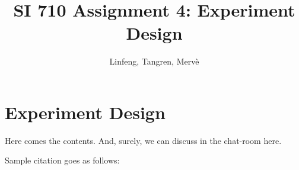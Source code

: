 \documentclass{article}
\title{SI 710 Assignment 4: Experiment Design}
\author{Linfeng, Tangren, Merv\`e}
\date{}
\begin{document}
\maketitle

\section{Experiment Design}

Here comes the contents. And, surely, we can discuss in the chat-room here.

Sample citation goes as follows: \cite{adams1995hitchhiker}



\end{document}
